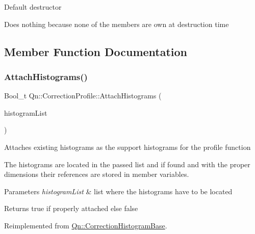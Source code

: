 Default destructor

Does nothing because none of the members are own at destruction time 

\subsection{Member Function Documentation}
\mbox{\label{classQn_1_1CorrectionProfile_a679319b8518152cf5563a87d77d87f2e}} 
\subsubsection{\texorpdfstring{Attach\+Histograms()}{AttachHistograms()}}
{\footnotesize\ttfamily Bool\+\_\+t Qn\+::\+Correction\+Profile\+::\+Attach\+Histograms (\begin{DoxyParamCaption}\item[{T\+List $\ast$}]{histogram\+List }\end{DoxyParamCaption})\hspace{0.3cm}{\ttfamily [virtual]}}

Attaches existing histograms as the support histograms for the profile function

The histograms are located in the passed list and if found and with the proper dimensions their references are stored in member variables.


\begin{DoxyParams}{Parameters}
{\em histogram\+List} & list where the histograms have to be located \\
\hline
\end{DoxyParams}
\begin{DoxyReturn}{Returns}
true if properly attached else false 
\end{DoxyReturn}


Reimplemented from \mbox{\hyperlink{classQn_1_1CorrectionHistogramBase_ad8bcd0079fe5db561780a522e46b7b16}{Qn\+::\+Correction\+Histogram\+Base}}.

\mbox{\label{classQn_1_1CorrectionProfile_a299a9d176bfeeb1966bedad226c7c4b2}} 
